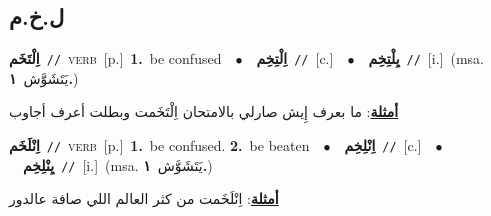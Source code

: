 \documentclass[10pt,a4paper,twoside]{article} %
\begin{document}
\begin{multicols}{2}
\vspace{-3mm}
\subsection*{\color{blue}\foreignlanguage{arabic}{ل.خ.م}\color{blue}{}} 

{\setlength\topsep{0pt}\textbf{\foreignlanguage{arabic}{اِلْتَخَم}}\ {\color{gray}\texttt{//}\color{black}}\ \textsc{verb}\ [p.]\ \textbf{1.}~be confused\ \ $\bullet$\ \ \setlength\topsep{0pt}\textbf{\foreignlanguage{arabic}{اِلْتِخِم}}\ {\color{gray}\texttt{//}\color{black}}\ [c.]\ \ $\bullet$\ \ \setlength\topsep{0pt}\textbf{\foreignlanguage{arabic}{يِلْتِخِم}}\ {\color{gray}\texttt{//}\color{black}}\ [i.]\ \color{gray}(msa. \foreignlanguage{arabic}{يَتَشَوَّش}~\foreignlanguage{arabic}{\textbf{١.}})\color{black}\  \begin{flushright}\color{gray}\foreignlanguage{arabic}{\textbf{\underline{\foreignlanguage{arabic}{أمثلة}}}: ما بعرف إِيش صارلي بالامتحان اِلْتَخَمت وبطلت أعرف أجاوب}\end{flushright}\color{black}} \vspace{2mm}

{\setlength\topsep{0pt}\textbf{\foreignlanguage{arabic}{اِنْلَخَم}}\ {\color{gray}\texttt{//}\color{black}}\ \textsc{verb}\ [p.]\ \textbf{1.}~be confused.  \textbf{2.}~be beaten\ \ $\bullet$\ \ \setlength\topsep{0pt}\textbf{\foreignlanguage{arabic}{اِنْلِخِم}}\ {\color{gray}\texttt{//}\color{black}}\ [c.]\ \ $\bullet$\ \ \setlength\topsep{0pt}\textbf{\foreignlanguage{arabic}{يِنْلِخِم}}\ {\color{gray}\texttt{//}\color{black}}\ [i.]\ \color{gray}(msa. \foreignlanguage{arabic}{يَتَشَوَّش}~\foreignlanguage{arabic}{\textbf{١.}})\color{black}\  \begin{flushright}\color{gray}\foreignlanguage{arabic}{\textbf{\underline{\foreignlanguage{arabic}{أمثلة}}}: اِنْلَخَمت من كثر العالم اللي صافة عالدور}\end{flushright}\color{black}} \vspace{2mm}


\end{multicols}
\end{document}
